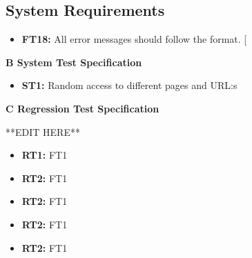 \documentclass{article}
\begin{document}
		\subsection{System Requirements }
		
		\begin{itemize}
  			\item \textbf{FT18:} All error messages should follow the format. [

		\end{itemize}
		
		\newpage
		\begin{flushleft}
		{\large \textbf{B System Test Specification}}
		\end{flushleft}
		
		
		
		\begin{itemize}
		
  			\item \textbf{ST1:} Random access to different pages and URL:s

		\end{itemize}
		
		\newpage
		\begin{flushleft}
		{\large \textbf{C Regression Test Specification}}
		\end{flushleft}
		
		**EDIT HERE**
		
		\begin{itemize}
		
  			\item \textbf{RT1:} FT1
  			
  			\item \textbf{RT2:} FT1
  			
  			\item \textbf{RT2:} FT1
  			
  			\item \textbf{RT2:} FT1
  			
  			\item \textbf{RT2:} FT1
  			

		\end{itemize}
		
		
			
		


\end{document}
